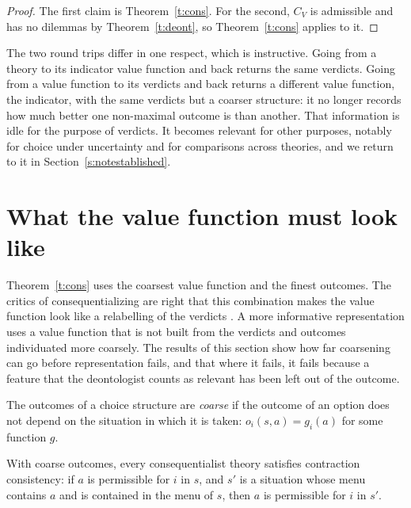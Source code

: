\documentclass{situationist-preprint}
\begin{document}
\begin{proof}
The first claim is Theorem~\ref{t:cons}. For the second, $C_V$ is admissible and has no dilemmas by Theorem~\ref{t:deont}, so Theorem~\ref{t:cons} applies to it.
\end{proof}

The two round trips differ in one respect, which is instructive. Going from a theory to its indicator value function and back returns the same verdicts. Going from a value function to its verdicts and back returns a different value function, the indicator, with the same verdicts but a coarser structure: it no longer records how much better one non-maximal outcome is than another. That information is idle for the purpose of verdicts. It becomes relevant for other purposes, notably for choice under uncertainty and for comparisons across theories, and we return to it in Section~\ref{s:notestablished}.

\section{What the value function must look like}\label{s:coarse}

Theorem~\ref{t:cons} uses the coarsest value function and the finest outcomes. The critics of consequentializing are right that this combination makes the value function look like a relabelling of the verdicts \citep{Vallentyne1988}. A more informative representation uses a value function that is not built from the verdicts and outcomes individuated more coarsely. The results of this section show how far coarsening can go before representation fails, and that where it fails, it fails because a feature that the deontologist counts as relevant has been left out of the outcome.

\begin{definition}\label{d:coarse}
The outcomes of a choice structure are \emph{coarse} if the outcome of an option does not depend on the situation in which it is taken: $o_i(s,a) = g_i(a)$ for some function $g$.
\end{definition}

\begin{proposition}\label{p:contraction}
With coarse outcomes, every consequentialist theory satisfies contraction consistency: if $a$ is permissible for $i$ in $s$, and $s'$ is a situation whose menu contains $a$ and is contained in the menu of $s$, then $a$ is permissible for $i$ in $s'$.
\end{proposition}
\end{document}
